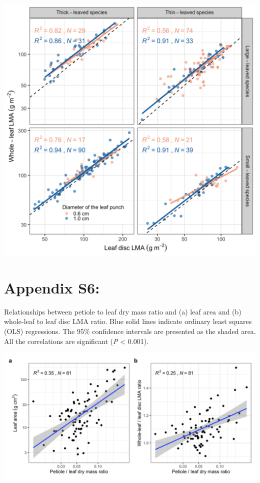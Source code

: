 \documentclass[
  12pt,
  a4paper,
,tablecaptionabove
]{scrartcl}
\begin{document}
\includegraphics[width=6.25in,height=\textheight]{../figs/LMA_sp_gr_both.png}

\hypertarget{appendix-s6}{%
\section{Appendix S6:}\label{appendix-s6}}

Relationships between petiole to leaf dry mass ratio and (a) leaf area
and (b) whole-leaf to leaf disc LMA ratio. Blue solid lines indicate
ordinary least squares (OLS) regressions. The 95\% confidence intervals
are presented as the shaded area. All the correlations are significant
(\emph{P} \textless{} 0.001).

\includegraphics[width=6.25in,height=\textheight]{../figs/petiole.png}
\end{document}
